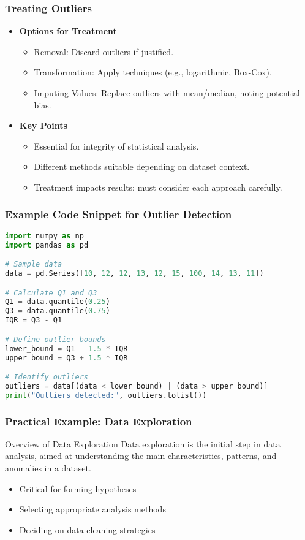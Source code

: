 \documentclass[aspectratio=169]{beamer}
\begin{document}
\begin{frame}
  \frametitle{Treating Outliers}
  \begin{itemize}
    \item \textbf{Options for Treatment}
      \begin{itemize}
        \item Removal: Discard outliers if justified.
        \item Transformation: Apply techniques (e.g., logarithmic, Box-Cox).
        \item Imputing Values: Replace outliers with mean/median, noting potential bias.
      \end{itemize}
    \item \textbf{Key Points}
      \begin{itemize}
        \item Essential for integrity of statistical analysis.
        \item Different methods suitable depending on dataset context.
        \item Treatment impacts results; must consider each approach carefully.
      \end{itemize}
  \end{itemize}
\end{frame}

\begin{frame}[fragile]
  \frametitle{Example Code Snippet for Outlier Detection}
  \begin{lstlisting}[language=Python]
import numpy as np
import pandas as pd

# Sample data
data = pd.Series([10, 12, 12, 13, 12, 15, 100, 14, 13, 11])

# Calculate Q1 and Q3
Q1 = data.quantile(0.25)
Q3 = data.quantile(0.75)
IQR = Q3 - Q1

# Define outlier bounds
lower_bound = Q1 - 1.5 * IQR
upper_bound = Q3 + 1.5 * IQR

# Identify outliers
outliers = data[(data < lower_bound) | (data > upper_bound)]
print("Outliers detected:", outliers.tolist())
  \end{lstlisting}
\end{frame}

\begin{frame}
  \frametitle{Practical Example: Data Exploration}
  \begin{block}{Overview of Data Exploration}
    Data exploration is the initial step in data analysis, aimed at understanding the main characteristics, patterns, and anomalies in a dataset. 
  \end{block}
  \begin{itemize}
    \item Critical for forming hypotheses
    \item Selecting appropriate analysis methods
    \item Deciding on data cleaning strategies
  \end{itemize}
\end{frame}
\end{document}
